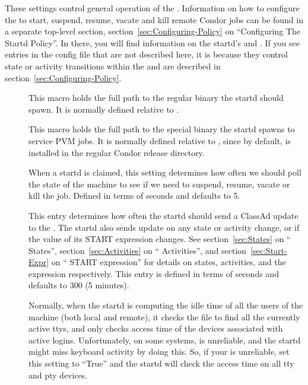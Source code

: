 These settings control general operation of the .
Information on how to configure the  to start, suspend,
resume, vacate and kill remote Condor jobs can be found in a separate
top-level section, section~\ref{sec:Configuring-Policy} on
``Configuring The Startd Policy''.  In there, you will find
information on the startd's  and .  If
you see entries in the config file that are not described here, it is
because they control state or activity transitions within the
 and are described in
section~\ref{sec:Configuring-Policy}.
\begin{description}

\item[] \label{param:Starter}  This macro holds the
  full path to the regular  binary the startd should 
  spawn.
  It is normally defined relative to .
  
\item[] \label{param:AlternateStarter1}
  This macro holds the full path to the special 
  binary the startd spawns to service PVM jobs.  It is normally
  defined relative to , since by default,
   is installed in the regular Condor release
  directory. 
  
\item[] \label{param:PollingInterval} When a
  startd is claimed, this setting determines how often we should poll
  the state of the machine to see if we need to suspend, resume,
  vacate or kill the job.  Defined in terms of seconds and defaults to
  5.
  
\item[] \label{param:UpdateInterval} This
  entry determines how often the startd should send a ClassAd update
  to the .  The startd also sends update on any
  state or activity change, or if the value of its START expression
  changes.  See section~\ref{sec:States} on ``
  States'', section~\ref{sec:Activities} on ``
  Activities'', and section~\ref{sec:Start-Expr} on ``
  START expression'' for details on states, activities, and the
   expression respectively.  This entry is defined in
  terms of seconds and defaults to 300 (5 minutes).
  
\item[] \label{param:StartdHasBadUtmp}
  Normally, when the startd is computing the idle time of all the
  users of the machine (both local and remote), it checks the
   file to find all the currently active ttys, and only
  checks access time of the devices associated with active logins.
  Unfortunately, on some systems,  is unreliable, and the
  startd might miss keyboard activity by doing this.  So, if your
   is unreliable, set this setting to ``True'' and the
  startd will check the access time on all tty and pty devices.
  

\end{description}
